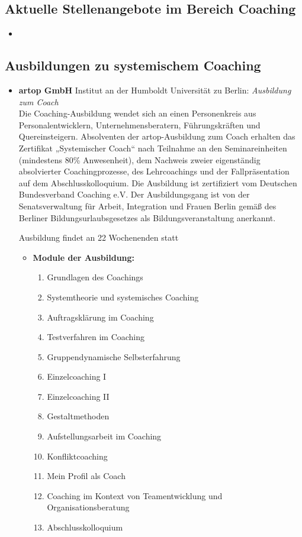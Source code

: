 \documentclass[11pt,a4paper]{article}
\begin{document}
\subsection*{\textsf{Aktuelle Stellenangebote im Bereich Coaching}}


\begin{itemize}
\item 
\end{itemize}


\subsection*{\textsf{Ausbildungen zu systemischem Coaching}}



\begin{itemize}
\item \textbf{artop GmbH} Institut an der Humboldt Universität zu Berlin: \textsl{Ausbildung zum Coach}\\
Die Coaching-Ausbildung wendet sich an einen Personenkreis aus Personalentwicklern, Unternehmensberatern, Führungskräften und Quereinsteigern. Absolventen der artop-Ausbildung zum Coach erhalten das Zertifikat „Systemischer Coach“ nach Teilnahme an den Seminareinheiten (mindestens 80\% Anwesenheit), dem Nachweis zweier eigenständig absolvierter Coachingprozesse, des Lehrcoachings und der Fallpräsentation auf dem Abschlusskolloquium. Die Ausbildung ist zertifiziert vom Deutschen Bundesverband Coaching e.V. Der Ausbildungsgang ist von der Senatsverwaltung für Arbeit, Integration und Frauen Berlin gemäß des Berliner Bildungsurlaubsgesetzes als Bildungsveranstaltung anerkannt. 

Ausbildung findet an 22 Wochenenden statt
	\begin{itemize}
	\item \textbf{Module der Ausbildung:}
		
		\begin{enumerate}
		\item Grundlagen des Coachings
		\item Systemtheorie und systemisches Coaching
		\item Auftragsklärung im Coaching
		\item Testverfahren im Coaching
		\item Gruppendynamische Selbsterfahrung
		\item Einzelcoaching I
		\item Einzelcoaching II
		\item Gestaltmethoden
		\item Aufstellungsarbeit im Coaching
		\item Konfliktcoaching
		\item Mein Profil als Coach
		\item Coaching im Kontext von Teamentwicklung und Organisationsberatung
		\item Abschlusskolloquium
		\end{enumerate}
	

\end{itemize}
\end{itemize}
\end{document}
